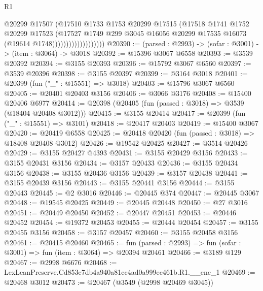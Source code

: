 \begin{lexlean}{R1}
\begin{coremodule}
                                  @20299
                                  @17507
                                  (@17510
                                    @1733
                                    @1753
                                    @20299
                                    @17515
                                    (@17518
                                      @1741
                                      @1752
                                      @20299
                                      @17523
                                      (@17527
                                        @1749
                                        @299
                                        @3045
                                        @16056
                                        @20299
                                        @17535
                                        @16073
                                        (@19614 @1748)))))))))))))))))))
@20390 := (parsed : @2993) -> (sofar : @3001) -> (item : @3064) -> @3018
@20392 := @15396 @3067 @6558
@20393 := @3539 @20392
@20394 := @3155 @20393
@20396 := @15792 @3067 @6560
@20397 := @3539 @20396
@20398 := @3155 @20397
@20399 := @3164 @3018
@20401 := @20399 (fun ("_" : @15551) => @3018)
@20403 := @15796 @3067 @6560
@20405 := @20401 @20403 @3156
@20406 := @3066 @3176
@20408 := @15400 @20406 @6977
@20414 := @20398 (@20405 (fun (passed : @3018) => @3539 (@18404 @20408 @3012)))
@20415 := @3155 @20414
@20417 := @20399 (fun ("_" : @15551) => @3101)
@20418 := @20417 @20403
@20419 := @15400 @3067
@20420 := @20419 @6558
@20425 := @20418 @20420 (fun (passed : @3018) => @18408 @20408 @3012)
@20426 := @19542 @20425
@20427 := @3514 @20426
@20429 := @3155 @20427 @4393
@20431 := @3155 @20429 @3156
@20433 := @3155 @20431 @3156
@20434 := @3157 @20433
@20436 := @3155 @20434 @3156
@20438 := @3155 @20436 @3156
@20439 := @3157 @20438
@20441 := @3155 @20439 @3156
@20443 := @3155 @20441 @3156
@20444 := @3155 @20443
@20445 := @2 @3016
@20446 := @20445 @374
@20447 := @20445 @3067
@20448 := @19545 @20425
@20449 := @20445 @20448
@20450 := @27 @3016
@20451 := @20449 @20450
@20452 := @20447 @20451
@20453 := @20446 @20452
@20454 := @19372 @20453
@20455 := @20444 @20454
@20457 := @3155 @20455 @3156
@20458 := @3157 @20457
@20460 := @3155 @20458 @3156
@20461 := @20415 @20460
@20465 := fun (parsed : @2993) => fun (sofar : @3001) => fun (item : @3064) => @20394 @20461
@20466 := @3189 @129
@20467 := @2998 @6676
@20468 := LexLeanPreserve.Cd853e7db4a940a81cc4ad0a999ec461b.R1.__enc_1
@20469 := @20468 @3012
@20473 := @20467 (@3549 (@2998 @20469 @3045))

\end{coremodule}
\end{lexlean}
